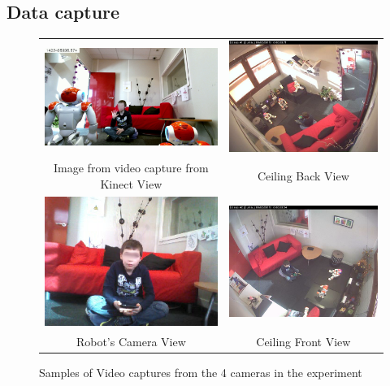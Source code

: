 \subsection{Data capture}
\begin{figure}[h]
	\begin{tabular}{|c | c|}
		\hline
		\includegraphics[width=0.45\columnwidth]{Figures/illustrate/k2a}&
		\includegraphics[width=0.45\columnwidth]{Figures/illustrate/ceilingb1}\\
		Image from video capture from Kinect View &
		Ceiling Back View \\\hline
		\includegraphics[width=0.45\columnwidth]{Figures/illustrate/robotview}&
		\includegraphics[width=0.45\columnwidth]{Figures/illustrate/ceilingf1}\\
		Robot's Camera View &
		Ceiling Front View\\ \hline
	\end{tabular}
	\caption{Samples of Video captures from the 4 cameras in the experiment}
	\label{fig:allcam}
\end{figure}


